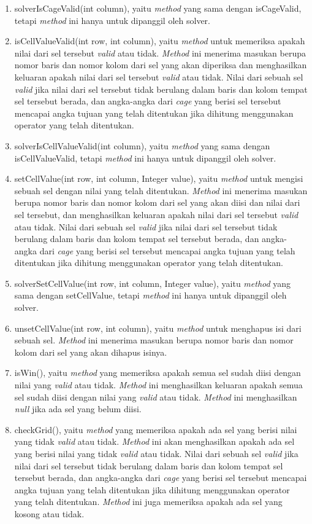 \begin{enumerate}
\item solverIsCageValid(int column), yaitu \textit{method} yang sama dengan isCageValid, tetapi \textit{method} ini hanya untuk dipanggil oleh solver.
\item isCellValueValid(int row, int column), yaitu \textit{method} untuk memeriksa apakah nilai dari sel tersebut \textit{valid} atau tidak. \textit{Method} ini menerima masukan berupa nomor baris dan nomor kolom dari sel yang akan diperiksa dan menghasilkan keluaran apakah nilai dari sel tersebut \textit{valid} atau tidak. Nilai dari sebuah sel \textit{valid} jika nilai dari sel tersebut tidak berulang dalam baris dan kolom tempat sel tersebut berada, dan angka-angka dari \textit{cage} yang berisi sel tersebut mencapai angka tujuan yang telah ditentukan jika dihitung menggunakan operator yang telah ditentukan.
\item solverIsCellValueValid(int column), yaitu \textit{method} yang sama dengan isCellValueValid, tetapi \textit{method} ini hanya untuk dipanggil oleh solver.
\item setCellValue(int row, int column, Integer value), yaitu \textit{method} untuk mengisi sebuah sel dengan nilai yang telah ditentukan. \textit{Method} ini menerima masukan berupa nomor baris dan nomor kolom dari sel yang akan diisi dan nilai dari sel tersebut, dan menghasilkan keluaran apakah nilai dari sel tersebut \textit{valid} atau tidak. Nilai dari sebuah sel \textit{valid} jika nilai dari sel tersebut tidak berulang dalam baris dan kolom tempat sel tersebut berada, dan angka-angka dari \textit{cage} yang berisi sel tersebut mencapai angka tujuan yang telah ditentukan jika dihitung menggunakan operator yang telah ditentukan.
\item solverSetCellValue(int row, int column, Integer value), yaitu \textit{method} yang sama dengan setCellValue, tetapi \textit{method} ini hanya untuk dipanggil oleh solver.
\item unsetCellValue(int row, int column), yaitu \textit{method} untuk menghapus isi dari sebuah sel. \textit{Method} ini menerima masukan berupa nomor baris dan nomor kolom dari sel yang akan dihapus isinya.
\item isWin(), yaitu \textit{method} yang memeriksa apakah semua sel sudah diisi dengan nilai yang \textit{valid} atau tidak. \textit{Method} ini menghasilkan keluaran apakah semua sel sudah diisi dengan nilai yang \textit{valid} atau tidak. \textit{Method} ini menghasilkan \textit{null} jika ada sel yang belum diisi.
\item checkGrid(), yaitu \textit{method} yang memeriksa apakah ada sel yang berisi nilai yang tidak \textit{valid} atau tidak. \textit{Method} ini akan menghasilkan apakah ada sel yang berisi nilai yang tidak \textit{valid} atau tidak. Nilai dari sebuah sel \textit{valid} jika nilai dari sel tersebut tidak berulang dalam baris dan kolom tempat sel tersebut berada, dan angka-angka dari \textit{cage} yang berisi sel tersebut mencapai angka tujuan yang telah ditentukan jika dihitung menggunakan operator yang telah ditentukan. \textit{Method} ini juga memeriksa apakah ada sel yang kosong atau tidak.

\end{enumerate}
